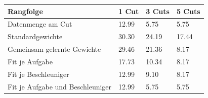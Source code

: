 \begin{tabular}{@{}llll@{}}
\toprule
Rangfolge & 1 Cut & 3 Cuts & 5 Cuts \\
\midrule
Datenmenge am Cut & 12.99 & 5.75 & 5.75 \\
Standardgewichte & 30.30 & 24.19 & 17.44 \\
Gemeinsam gelernte Gewichte & 29.46 & 21.36 & 8.17 \\
Fit je Aufgabe & 17.73 & 10.34 & 8.17 \\
Fit je Beschleuniger & 12.99 & 9.10 & 8.17 \\
Fit je Aufgabe und Beschleuniger & 12.99 & 5.75 & 5.75 \\
\bottomrule
\end{tabular}
